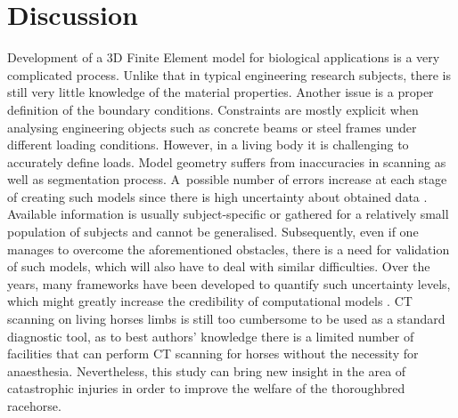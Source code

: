 \documentclass[11pt]{ACMEarticle}
\numberwithin{equation}{section}
\begin{document}

\section{Discussion}
Development of a 3D Finite Element model for biological applications is a very complicated process. Unlike that in typical engineering research subjects, there is still very little knowledge of the material properties. Another issue is a proper definition of the boundary conditions. Constraints are mostly explicit when analysing engineering objects such as concrete beams or steel frames under different loading conditions. However, in a living body it is challenging to accurately define loads. Model geometry suffers from inaccuracies in scanning as well as segmentation process. A~possible number of errors increase at each stage of creating such models since there is high uncertainty about obtained data \citep{campoli2014effects}. Available information is usually subject-specific or gathered for a relatively small population of subjects and cannot be generalised. Subsequently, even if one manages to overcome the aforementioned obstacles, there is a need for validation of such models, which will also have to deal with similar difficulties. Over the years, many frameworks have been developed to quantify such uncertainty levels, which might greatly increase the credibility of computational models \citep{wille2016uncertainty}. CT scanning on living horses limbs is still too cumbersome to be used as a standard diagnostic tool, as to best authors' knowledge there is a limited number of facilities that can perform CT scanning for horses without the necessity for anaesthesia. Nevertheless, this study can bring new insight in the area of catastrophic injuries in order to improve the welfare of the thoroughbred racehorse. %
\end{document}
